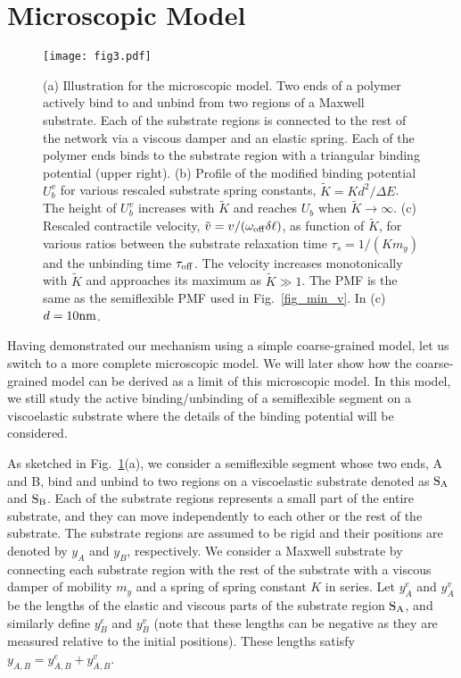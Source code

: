 \documentclass[twocolumn,prl,english]{revtex4-1}
\begin{document}
\section{Microscopic Model}
\label{s3}
\begin{figure*}[t]
	\centering
	\texttt{[image: fig3.pdf]}
	\caption{(a) Illustration for the microscopic model. Two ends of a polymer actively bind to and unbind from two regions of a Maxwell substrate. Each of the substrate regions is connected to the rest of the network via a viscous damper and an elastic spring.  Each of the polymer ends binds to the substrate region with a triangular binding potential (upper right). (b) Profile of the modified binding potential $U_b^v$  for various rescaled substrate spring constants, $\tilde K = K d^2/\Delta E$. The height of $U_b^v$ increases with $\tilde K$ and reaches $U_b$ when $\tilde K \to \infty$. (c) Rescaled contractile velocity, $\tilde v = v /(\omega_{\rm off }\delta \ell)$, as function of $\tilde K$, for various ratios between the substrate relaxation time $\tau_s=1/(Km_y)$ and the unbinding time $\tau_{\rm off}$. The velocity increases monotonically with $\tilde K$ and approaches its maximum as $\tilde K \gg 1$. The PMF is the same as the semiflexible PMF used in Fig.~\ref{fig_min_v}.  In (c) $d=10 \rm nm$.   }
	\label{fig_ve}
\end{figure*}
Having demonstrated our mechanism using a simple coarse-grained model, let us switch to a more complete microscopic model. We will later show how the coarse-grained model can be derived as a limit of this microscopic model.  In this model, we still study the active binding/unbinding of a semiflexible segment on a viscoelastic substrate where the details of the binding potential will be considered.  

As sketched in Fig.~\ref{fig_ve}(a), we consider a semiflexible segment whose two ends, A and B, bind and unbind to two regions on a viscoelastic substrate denoted as $\rm S_A$ and $\rm S_B$. Each of the substrate regions represents a small part of the entire substrate, and they can move independently to each other or the rest of the substrate. The substrate regions are assumed to be rigid and their positions are denoted by $y_A$ and $y_B$, respectively. We consider a Maxwell substrate by connecting each substrate region with the rest of the substrate with a viscous damper of mobility $m_y$ and a spring of spring constant $K$ in series. Let $y_{A}^e$ and $y_{A}^v$ be the lengths of the elastic and viscous parts of the substrate region $\rm S_A$, and similarly define $y_{B}^e$ and $y_{B}^v$ (note that these lengths can be negative as they are measured relative to the initial positions). These lengths satisfy $y_{A,B} = y_{A,B}^e + y_{A,B}^v$. 
\end{document}
